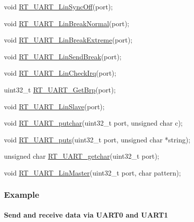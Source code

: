 \begin{DoxyCode}
\textcolor{keywordtype}{void} \mbox{\hyperlink{a00056_aea01869278bc3c4e332af854c4e660be}{RT\_UART\_LinSyncOff}}(port);

\textcolor{keywordtype}{void} \mbox{\hyperlink{a00056_a45d1e1116c5b535f276acc73e522570f}{RT\_UART\_LinBreakNormal}}(port);

\textcolor{keywordtype}{void} \mbox{\hyperlink{a00056_a9e7d98206f07485a3347bab6672a971c}{RT\_UART\_LinBreakExtreme}}(port);

\textcolor{keywordtype}{void} \mbox{\hyperlink{a00056_ad1e6c13693e5ea54a55ce78635617178}{RT\_UART\_LinSendBreak}}(port);

\textcolor{keywordtype}{void} \mbox{\hyperlink{a00056_a2e2715198f9716282584f34a7f472649}{RT\_UART\_LinCheckIrq}}(port);

uint32\_t \mbox{\hyperlink{a00056_a74f1bca1f0b60eeec1f84bcba3e34919}{RT\_UART\_GetBrp}}(port);

\textcolor{keywordtype}{void} \mbox{\hyperlink{a00056_a3f9518fa74ec401803fe1d15e0d39ff2}{RT\_UART\_LinSlave}}(port);

\textcolor{keywordtype}{void} \mbox{\hyperlink{a00056_ab03e9e1a8d4d9b97583db27174086108}{RT\_UART\_putchar}}(uint32\_t port, \textcolor{keywordtype}{unsigned} \textcolor{keywordtype}{char} c);

\textcolor{keywordtype}{void} \mbox{\hyperlink{a00056_ad61c03a00ccd43875563c16f97d61af7}{RT\_UART\_puts}}(uint32\_t port, \textcolor{keywordtype}{unsigned} \textcolor{keywordtype}{char} *\textcolor{keywordtype}{string});

\textcolor{keywordtype}{unsigned} \textcolor{keywordtype}{char} \mbox{\hyperlink{a00056_abc136df9d66fe27bf8ffcc319246591e}{RT\_UART\_getchar}}(uint32\_t port);

\textcolor{keywordtype}{void} \mbox{\hyperlink{a00056_ab0faf051e642e540b1b9c114eae242bd}{RT\_UART\_LinMaster}}(uint32\_t port, \textcolor{keywordtype}{char} pattern);
\end{DoxyCode}


\subsubsection*{Example}

\paragraph*{Send and receive data via U\+A\+R\+T0 and U\+A\+R\+T1}



